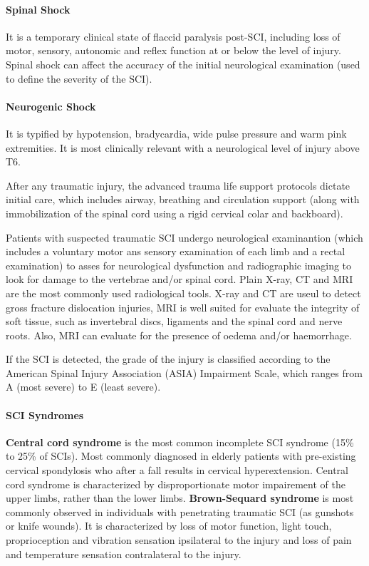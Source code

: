 \documentclass[12pt,article,oneside,a4paper]{memoir}
\begin{document}
\paragraph{Spinal Shock}
It is a temporary clinical state of flaccid paralysis post-SCI, including loss
of motor, sensory, autonomic and reflex function at or below the level of
injury. Spinal shock can affect the accuracy of the initial neurological
examination (used to define the severity of the SCI).

\paragraph{Neurogenic Shock}
It is typified by hypotension, bradycardia, wide pulse pressure and warm pink
extremities. It is most clinically relevant with a neurological level of injury
above T6.

After any traumatic injury, the advanced trauma life support protocols dictate
initial care, which includes airway, breathing and circulation support (along
with immobilization of the spinal cord using a rigid cervical colar and
backboard).

Patients with suspected traumatic SCI undergo neurological examinantion (which
includes a voluntary motor ans sensory examination of each limb and a rectal
examination) to asses for neurological dysfunction and radiographic imaging to
look for damage to the vertebrae and/or spinal cord.
Plain X-ray, CT and MRI are the most commonly used radiological tools. X-ray
and CT are useul to detect gross fracture dislocation injuries, MRI is well
suited for evaluate the integrity of soft tissue, such as invertebral discs,
ligaments and the spinal cord and nerve roots. Also, MRI can evaluate for the
presence of oedema and/or haemorrhage.

If the SCI is detected, the grade of the injury is classified according to the
American Spinal Injury Association (ASIA) Impairment Scale, which ranges from A
(most severe) to E (least severe).

\paragraph{SCI Syndromes}
\textbf{Central cord syndrome} is the most common incomplete SCI syndrome (15\%
to 25\% of SCIs). Most commonly diagnosed in elderly patients with pre-existing
cervical spondylosis who after a fall results in cervical hyperextension.
Central cord syndrome is characterized by disproportionate motor impairement of
the upper limbs, rather than the lower limbs. \textbf{Brown-Sequard syndrome}
is most commonly observed in individuals with penetrating traumatic SCI (as
gunshots or knife wounds). It is characterized by loss of motor function, light
touch, proprioception and vibration sensation ipsilateral to the injury and
loss of pain and temperature sensation contralateral to the injury.
\end{document}
